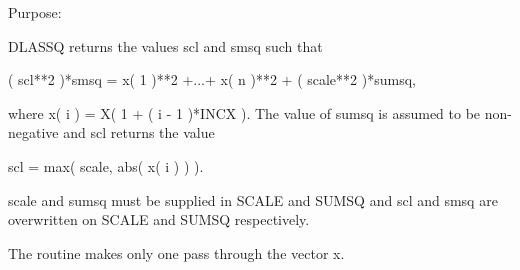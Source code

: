  \begin{DoxyParagraph}{Purpose\+: }
\begin{DoxyVerb} DLASSQ  returns the values  scl  and  smsq  such that

    ( scl**2 )*smsq = x( 1 )**2 +...+ x( n )**2 + ( scale**2 )*sumsq,

 where  x( i ) = X( 1 + ( i - 1 )*INCX ). The value of  sumsq  is
 assumed to be non-negative and  scl  returns the value

    scl = max( scale, abs( x( i ) ) ).

 scale and sumsq must be supplied in SCALE and SUMSQ and
 scl and smsq are overwritten on SCALE and SUMSQ respectively.

 The routine makes only one pass through the vector x.\end{DoxyVerb}
 
\end{DoxyParagraph}

